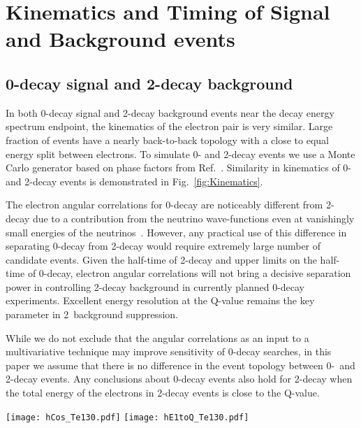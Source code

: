 \section{Kinematics and Timing of Signal and Background events}
\label{sec:kinematics_and_timing}

\subsection{0\nbb-decay signal and 2\nbb-decay background}

In both 0\nbb-decay signal and 2\nbb-decay background events near the decay energy spectrum endpoint, the kinematics of the
electron pair is very similar. Large fraction of events have a nearly back-to-back topology with a close to 
equal energy split between electrons. To simulate 0\nbb- and 2\nbb-decay events we use a Monte Carlo generator based on phase 
factors from Ref.~\cite{Jenni}. Similarity in kinematics of 0\nbb- and 2\nbb-decay events is demonstrated in Fig.~\ref{fig:Kinematics}.

The electron angular correlations for 0\nbb-decay are noticeably different from 2\nbb-decay due to a contribution from the
neutrino wave-functions even at vanishingly small energies of the neutrinos~\cite{Jenni}. However, any practical use of this difference 
in separating 0\nbb-decay from 2\nbb-decay would require extremely large number of candidate events. Given the half-time of 2\nbb-decay 
and upper limits on the half-time of 0\nbb-decay, electron angular correlations will not bring a decisive separation power in controlling 
2\nbb-decay background in currently planned 0\nbb-decay experiments. Excellent energy resolution at the Q-value remains the key parameter
in 2\nbb~background suppression.

While we do not exclude that the angular correlations as an input to a multivariative technique may improve sensitivity of 0\nbb-decay 
searches, in this paper we assume that there is no difference in the event topology between 0\nbb-~and 2\nbb-decay events. Any conclusions 
about 0\nbb-decay events also hold for 2\nbb-decay when the total energy of the electrons in 2\nbb-decay events is close to the Q-value.


\begin{figure*}[ht]
  \centering
  \texttt{[image: hCos\_Te130.pdf]}
  \texttt{[image: hE1toQ\_Te130.pdf]}
  \caption{Comparison between kinematics of 0{\nbb} (\emph{dashed red
      lines}) and 2{\nbb} decays (\emph{solid black lines}) for events
    with the total kinetic energy of the electrons above 90\% of the
    Q-value. \emph{Left:} Cosine of the angle between two
    electrons. \emph{Right:} Fraction of energy carried by one of the
    two electrons. Vertical bars at each bin of the histograms indicate
    statistical uncertainty for that bin.}
  \label{fig:Kinematics}
\end{figure*}


